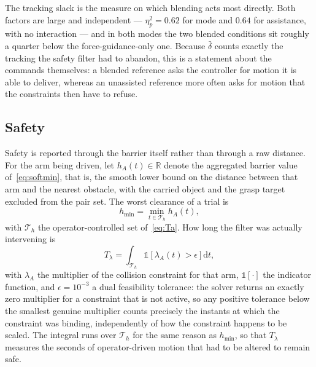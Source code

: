\documentclass[12pt,a4paper,twoside,openright]{report}
\begin{document}
The tracking slack is the measure on which blending acts most directly. Both factors are large and independent --- $\eta^2_p = 0.62$ for mode and $0.64$ for assistance, with no interaction --- and in both modes the two blended conditions sit roughly a quarter below the force-guidance-only one. Because $\bar\delta$ counts exactly the tracking the safety filter had to abandon, this is a statement about the commands themselves: a blended reference asks the controller for motion it is able to deliver, whereas an unassisted reference more often asks for motion that the constraints then have to refuse.



\subsection{Safety}
\label{sec:ressafety}

Safety is reported through the barrier itself rather than through a raw distance. For the arm being driven, let $h_A(t) \in \mathbb{R}$ denote the aggregated barrier value of~\eqref{eq:softmin}, that is, the smooth lower bound on the distance between that arm and the nearest obstacle, with the carried object and the grasp target excluded from the pair set. The worst clearance of a trial is
\begin{equation}
h_{\min} = \min_{t \in \mathcal{T}_h} h_A(t),
\label{eq:mhmin}
\end{equation}
with $\mathcal{T}_h$ the operator-controlled set of~\eqref{eq:Ta}. How long the filter was actually intervening is
\begin{equation}
T_{\lambda} = \int_{\mathcal{T}_h} \mathbb{1}\!\left[\lambda_A(t) > \epsilon\right] \mathrm{d}t,
\label{eq:mTlam}
\end{equation}
with $\lambda_A$ the multiplier of the collision constraint for that arm, $\mathbb{1}[\cdot]$ the indicator function, and $\epsilon = 10^{-3}$ a dual feasibility tolerance: the solver returns an exactly zero multiplier for a constraint that is not active, so any positive tolerance below the smallest genuine multiplier counts precisely the instants at which the constraint was binding, independently of how the constraint happens to be scaled. The integral runs over $\mathcal{T}_h$ for the same reason as $h_{\min}$, so that $T_{\lambda}$ measures the seconds of operator-driven motion that had to be altered to remain safe.
\end{document}

